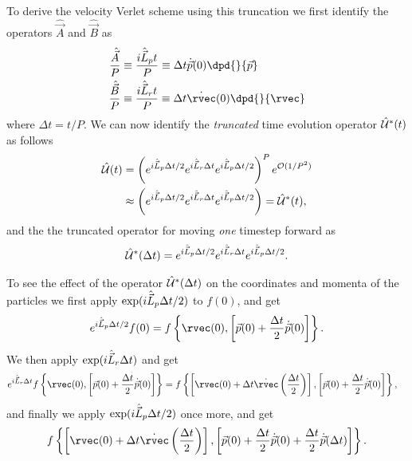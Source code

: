To derive the velocity Verlet scheme using this truncation we first identify the operators $\hat {\vec A}$ and $\hat {\vec B}$ as
\begin{align*}
    \frac{\hat {\vec A}}{P} &\equiv \frac{\Liou_p t}{P} \equiv \Delta t \dot {\vec p}(0) \dpd{}{\vec p} \\
    \frac{\hat {\vec B}}{P} &\equiv \frac{\Liou_r t}{P} \equiv \Delta t \dot \rvec (0) \dpd{}{\rvec}
\end{align*}
where $\Delta t = t/P$. We can now identify the \emph{truncated} time evolution operator $\hat{\mathcal{U}}^*(t)$ as follows
\begin{align}
    \hat{\mathcal{U}}(t) 
    &= \left( e^{i\hat{\vec L}_p\Delta t/2} e^{i\hat{\vec L}_r \Delta t} e^{i\hat{\vec L}_p \Delta t/2} \right)^P e^{\mathcal{O}(1/P^2)} \nonumber\\
    &\approx \left( e^{i\hat{\vec L}_p\Delta t/2} e^{i\hat{\vec L}_r \Delta t} e^{i\hat{\vec L}_p \Delta t/2} \right) = \hat{\mathcal{U}}^*(t),
    \label{eq:liou_time_trunc}
\end{align}
and the the truncated operator for moving \emph{one} timestep forward as
\begin{align}
    \hat{\mathcal{U}}^*(\Delta t) = e^{i\hat{\vec L}_p\Delta t/2} e^{i\hat{\vec L}_r \Delta t} e^{i\hat{\vec L}_p \Delta t/2}.
    \label{eq:liou_onetime_trunc}
\end{align}

To see the effect of the operator $\hat{\mathcal{U}}^*(\Delta t)$ on the coordinates and momenta of the particles we first apply $\exp(i\hat{\vec L}_p\Delta t/2)$ to $f(0)$, and get
\begin{align*}
    e^{\Liou_p \Delta t/2} f(0) = f \left\{ \rvec(0), \left[ \vec p(0) + \frac{\Delta t}{2} \dot{\vec p}(0) \right] \right\}.
\end{align*}
We then apply $\exp(i\hat{\vec L}_r\Delta t)$ and get
\begin{align*}
     e^{\Liou_r \Delta t} f \left\{ \rvec(0), \left[ \vec p(0) + \frac{\Delta t}{2}\dot{\vec p}(0) \right] \right\}
     &= f \left\{ \left[ \rvec(0) + \Delta t \dot\rvec\left(\frac{\Delta t}{2}\right) \right], \left[ \vec p(0) + \frac{\Delta t}{2}\dot{\vec p}(0) \right] \right\},
\end{align*}
and finally we apply $\exp(i\hat{\vec L}_p\Delta t/2)$ once more, and get
\begin{align*}
    f \left\{ 
        \left[ \rvec(0) + \Delta t \dot\rvec\left(\frac{\Delta t}{2}\right) \right], 
        \left[ \vec p(0) + \frac{\Delta t}{2}\dot{\vec p}(0) + \frac{\Delta t}{2}\dot{\vec p}(\Delta t) \right] 
    \right\}.
\end{align*}

